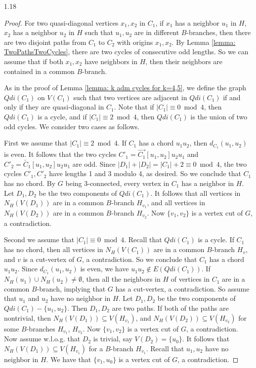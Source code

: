 \documentclass[10pt]{article}
\begin{document}
\begin{spacing}{1.18}
\begin{proof}
    For two quasi-diagonal vertices $x_1,x_2$ in $C_1$, if $x_1$ has a neighbor $u_1$ in $H$, $x_2$ has a neighbor $u_2$ in $H$ such that $u_1,u_2$ are in different $B$-branches, then there are two disjoint paths from $C_1$ to $C_2$ with origins $x_1,x_2$. By Lemma \ref{lemma: TwoPathsTwoCycles}, there are two cycles of consecutive odd lengths. So we can assume that if both $x_1,x_2$ have neighbors in $H$, then their neighbors are contained in a common $B$-branch. 

    As in the proof of Lemma \ref{lemma: k adm cycles for k=4,5}, we define the graph $Qdi(C_1)$ on $V(C_1)$ such that two vertices are adjacent in $Qdi(C_1)$ if and only if they are quasi‐diagonal in $C_1$. Note that if $|C_1|\equiv 0\bmod 4$, then $Qdi(C_1)$ is a cycle, and if $|C_1|\equiv 2\bmod 4$, then $Qdi(C_1)$ is the union of two odd cycles. We consider two cases as follows.

    First we assume that $|C_1|\equiv 2\bmod 4$. If $C_1$ has a chord $u_1u_2$, then $d_{C_1}(u_1,u_2)$ is even. It follows that the two cycles $C'_1=\overrightarrow{C_1}[u_1,u_2]u_2u_1$ and $C'_2=\overleftarrow{C_1}[u_1,u_2]u_2u_1$ are odd. Since $|D_1|+|D_2|=|C_1|+2\equiv 0\bmod 4$, the two cycles $C'_1,C'_2$ have lengths 1 and 3 modulo 4, as desired. So we conclude that $C_1$ has no chord.
    By $G$ being 3-connected, every vertex in $C_1$ has a neighbor in $H$. Let $D_1,D_2$ be the two components of $Qdi(C_1)$. It follows that all vertices in $N_H(V(D_1))$ are in a common $B$-branch $H_{v_1}$, and all vertices in $N_H(V(D_2))$ are in a common $B$-branch $H_{v_2}$. Now $\{v_1,v_2\}$ is a vertex cut of $G$, a contradiction.

    Second we assume that $|C_1|\equiv 0\bmod 4$. Recall that $Qdi(C_1)$ is a cycle. If $C_1$ has no chord, then all vertices in $N_H(V(C_1))$ are in a common $B$-branch $H_v$, and $v$ is a cut-vertex of $G$, a contradiction. So we conclude that $C_1$ has a chord $u_1u_2$. Since $d_{C_1}(u_1,u_2)$ is even, we have $u_1u_2\notin E(Qdi(C_1))$.
    If $N_H(u_1)\cup N_H(u_2)\neq\emptyset$, then all the neighbors in $H$ of vertices in $C_1$ are in a common $B$-branch, implying that $G$ has a cut-vertex, a contradiction. So assume that $u_1$ and $u_2$ have no neighbor in $H$.
    Let $D_1,D_2$ be the two components of $Qdi(C_1)-\{u_1,u_2\}$. Then $D_1,D_2$ are two paths. If both of the paths are nontrivial, then $N_H(V(D_1))\subseteq V(H_{v_1})$, and $N_H(V(D_2))\subseteq V(H_{v_2})$ for some $B$-branches $H_{v_1}$, $H_{v_2}$. Now $\{v_1,v_2\}$ is a vertex cut of $G$, a contradiction.
    Now assume w.l.o.g. that $D_2$ is trivial, say $V(D_2)=\{u_0\}$. It follows that $N_H(V(D_1))\subseteq V(H_{v_1})$ for a $B$-branch $H_{v_1}$. Recall that $u_1,u_2$ have no neighbor in $H$. We have that $\{v_1,u_0\}$ is a vertex cut of $G$, a contradiction.    


\end{proof}
\end{spacing}
\end{document}
